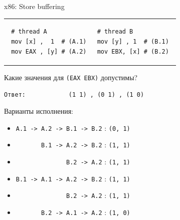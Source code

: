  \begin{frame}{x86: Store buffering}
 
 \begin{tabular}{p{} p{}}
 \begin{verbatim}
 # thread A
 mov [x] ,  1  # (A.1)
 mov EAX , [y] # (A.2)
 \end{verbatim}
 
 & 
 
 \begin{verbatim}
 # thread B          
 mov [y] , 1  # (B.1) 
 mov EBX, [x] # (B.2) 
 \end{verbatim}
 \end{tabular}
 
 Какие значения для \texttt{(EAX EBX)} допустимы?
 
 \texttt{Ответ:\ \ \ \ \ \ \ \ \ \ \ \ (1 1)\ , (0 1)\ , (1 0)}
 
 Варианты исполнения:
 \begin{itemize}
     \item \texttt{A.1 -> A.2 -> B.1 -> B.2}                            : \texttt{(0, 1)}
     \item \texttt{\ \ \ \ \ \ \       B.1 -> A.2 -> B.2}               : \texttt{(1, 1)}
     \item \texttt{\ \ \ \ \ \ \ \ \ \ \ \ \ \              B.2 -> A.2} : \texttt{(1, 1)}
     \item \texttt{B.1 -> A.1 -> A.2 -> B.2}                            : \texttt{(1, 1)}
     \item \texttt{\ \ \ \ \ \ \ \ \ \ \ \ \ \              B.2 -> A.2} : \texttt{(1, 1)}
     \item \texttt{\ \ \ \ \ \ \       B.2 -> A.1 -> A.2}               : \texttt{(1, 0)}
 \end{itemize}
 \end{frame}
 
